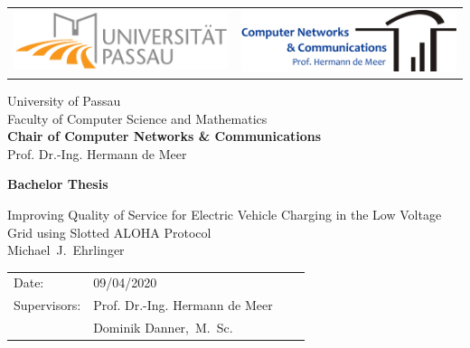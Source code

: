 \documentclass[fontsize=12pt,openright,twoside,paper=a4,BCOR=1cm]{scrbook}
\newcommand{\authornamefirst}{Michael}
\newcommand{\authornamemiddle}{J.}
\newcommand{\authornamelast}{Ehrlinger}
\newcommand{\worktitle}{Improving Quality of Service for Electric Vehicle Charging in the Low Voltage Grid using Slotted ALOHA Protocol}
\newcommand{\thesistype}{Bachelor Thesis}
\newcommand{\thesisdate}{09/04/2020}
\newcommand{\thesisprof}{Prof. Dr.-Ing. Hermann de Meer}
\newcommand{\supervisor}{Dominik Danner,~M.~Sc.}
\newcommand{\chair}{Chair of Computer Networks \& Communications}
\begin{document}
\thispagestyle{empty}
\newpage

\vspace{1cm}

\begin{center}
\begin{tabular}{lr}
\includegraphics[width=6.5cm]{img/logouni.pdf}
&
\includegraphics[width=6.5cm]{img/logochair.pdf}
\end{tabular}

\vspace{3cm}
\Large University of Passau
\\
\Large Faculty of Computer Science and Mathematics
\\
\vspace{0.3cm}
\Large {\bf \chair }
\\
\Large \thesisprof

\end{center}


\vspace{4.5cm}

\begin{center}
        {\bf\Huge \thesistype} %
\end{center}

\begin{center}
        \settowidth{\baselineskip}{0.4cm}
        {\LARGE \worktitle}
        \\
        {\Large
        \authornamefirst~\authornamemiddle~\authornamelast
        }
\end{center}

\vfill {%

\vfill


{\large
\begin{tabular}[l]{llll}

Date:       & \thesisdate %
\smallskip \\
Supervisors:   & \thesisprof \\
	& \supervisor \\
\end{tabular}}
} \cleardoublepage
\end{document}
